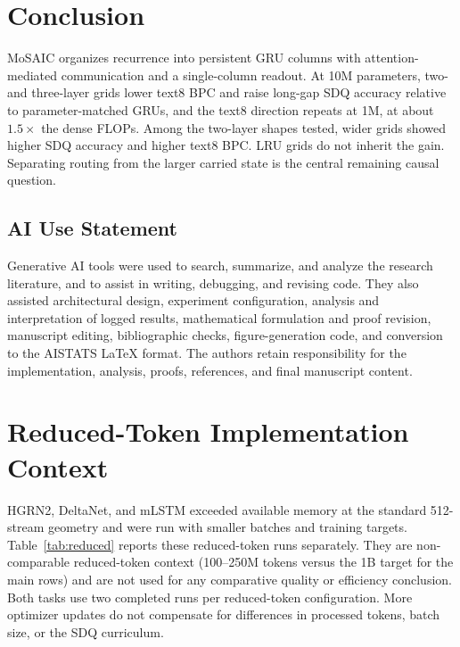 \documentclass[letterpaper,twoside]{article}
\begin{document}
\section{Conclusion}

MoSAIC organizes recurrence into persistent GRU columns with attention-mediated communication and a single-column readout. At 10M parameters, two- and three-layer grids lower text8 BPC and raise long-gap SDQ accuracy relative to parameter-matched GRUs, and the text8 direction repeats at 1M, at about $1.5\times$ the dense FLOPs. Among the two-layer shapes tested, wider grids showed higher SDQ accuracy and higher text8 BPC. LRU grids do not inherit the gain. Separating routing from the larger carried state is the central remaining causal question.

\clearpage
\subsection*{AI Use Statement}

Generative AI tools were used to search, summarize, and analyze the research literature, and to assist in writing, debugging, and revising code. They also assisted architectural design, experiment configuration, analysis and interpretation of logged results, mathematical formulation and proof revision, manuscript editing, bibliographic checks, figure-generation code, and conversion to the AISTATS LaTeX format. The authors retain responsibility for the implementation, analysis, proofs, references, and final manuscript content.



\clearpage


\clearpage
\appendix
\onecolumn
\raggedbottom
\def\mosaicbayesinappendix{}


\section{Reduced-Token Implementation Context}\label{app:reduced}

HGRN2, DeltaNet, and mLSTM exceeded available memory at the standard 512-stream geometry and were run with smaller batches and training targets. Table~\ref{tab:reduced} reports these reduced-token runs separately. They are non-comparable reduced-token context (100--250M tokens versus the 1B target for the main rows) and are not used for any comparative quality or efficiency conclusion. Both tasks use two completed runs per reduced-token configuration. More optimizer updates do not compensate for differences in processed tokens, batch size, or the SDQ curriculum.
\end{document}
